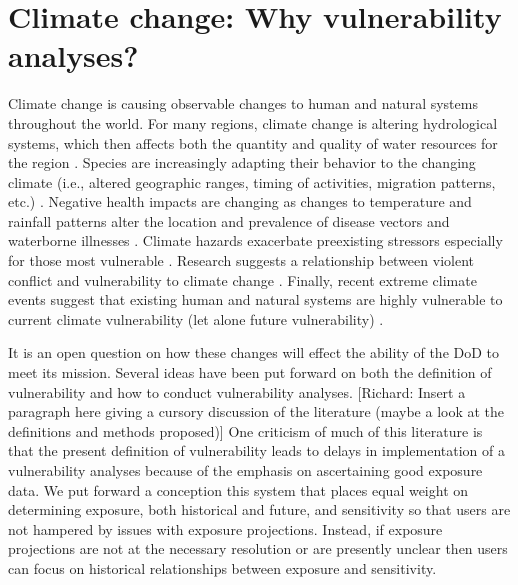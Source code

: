 \documentclass[10pt]{amsart}
\begin{document}
\section{Climate change: Why vulnerability analyses?}
Climate change is causing observable changes to human and natural systems throughout the world.
For many regions, climate change is altering hydrological systems, which then affects both the quantity and quality of water resources for the region \parencite{field2014summary}.
Species are increasingly adapting their behavior to the changing climate (i.e., altered geographic ranges, timing of activities, migration patterns, etc.) \parencite{field2014summary}.
Negative health impacts are changing as changes to temperature and rainfall patterns alter the location and prevalence of disease vectors and waterborne illnesses \parencite{field2014summary}.
Climate hazards exacerbate preexisting stressors especially for those most vulnerable \parencite{field2014summary}.
Research suggests a relationship between violent conflict and vulnerability to climate change \parencite{field2014summary}.
Finally, recent extreme climate events suggest that existing human and natural systems are highly vulnerable to current climate vulnerability (let alone future vulnerability) \parencite{field2014summary}.

It is an open question on how these changes will effect the ability of the DoD to meet its mission.
Several ideas have been put forward on both the definition of vulnerability and how to conduct vulnerability analyses.
[Richard: Insert a paragraph here giving a cursory discussion of the literature (maybe a look at the definitions and methods proposed)]
One criticism of much of this literature is that the present definition of vulnerability leads to delays in implementation of a vulnerability analyses because of the emphasis on ascertaining good exposure data.
We put forward a conception this system that places equal weight on determining exposure, both historical and future, and sensitivity so that users are not hampered by issues with exposure projections.
Instead, if exposure projections are not at the necessary resolution or are presently unclear then users can focus on historical relationships between exposure and sensitivity.
\end{document}
